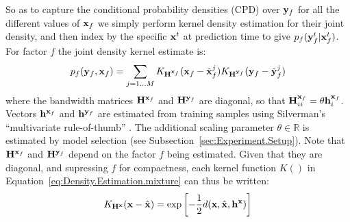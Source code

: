 So as to capture the conditional probability densities (CPD) over $\mathbf{y}_f$ for all the different values of $\mathbf{x}_f$ we simply perform kernel density estimation for their joint density, and then  index by the specific $\mathbf{x}^t$ at prediction time to give $p_f(\mathbf{y}_f^t|\mathbf{x}_f^t)$. For factor $f$ the joint density kernel estimate is:
\begin{equation}
p_f(\by_f,\bx_f) = \mathop{\sum}_{j=1 \ldots M}
K_{\mathbf{H}^{\bx_f}}(\bx_f - \hat{\bx}_f^j)
K_{\mathbf{H}^{\by_f}}(\by_f - \hat{\by}_f^j)
\label{eq:Density.Estimation.mixture}
\end{equation}
\noindent where the bandwidth matrices  $\mathbf{H}^{\mathbf{x}_f} $ and $\mathbf{H}^{\mathbf{y}_f} $ are diagonal, so that $\mathbf{H}^{\mathbf{x}_f}_{ii}  = \theta \mathbf{h}^{\mathbf{x}_f}_i$. Vectors $\mathbf{h}^{\mathbf{x}_f}$ and $\mathbf{h}^{\mathbf{y}_f}$  are estimated from training samples using Silverman's ``multivariate rule-of-thumb'' \cite{scott2004multi-dimensional}. The additional scaling parameter $\theta \in \mathbb{R}$ is estimated by model selection (see Subsection~\ref{sec:Experiment.Setup}). Note that $\mathbf{H}^{\mathbf{x}_f}$ and $\mathbf{H}^{\mathbf{y}_f}$ depend on the factor $f$ being estimated. Given that they are diagonal, and supressing $f$ for compactness, each kernel function $K()$ in Equation~\eqref{eq:Density.Estimation.mixture} can thus be written:
\begin{equation}
K_{\mathbf{H}^\bx}(\bx - \hat{\bx}) = \exp \left[-\frac{1}{2}d(\bx, \hat{\bx}, \mathbf{h^{x}}) \right]
\label{eq:Density.Estimation.kernel}
\end{equation}

